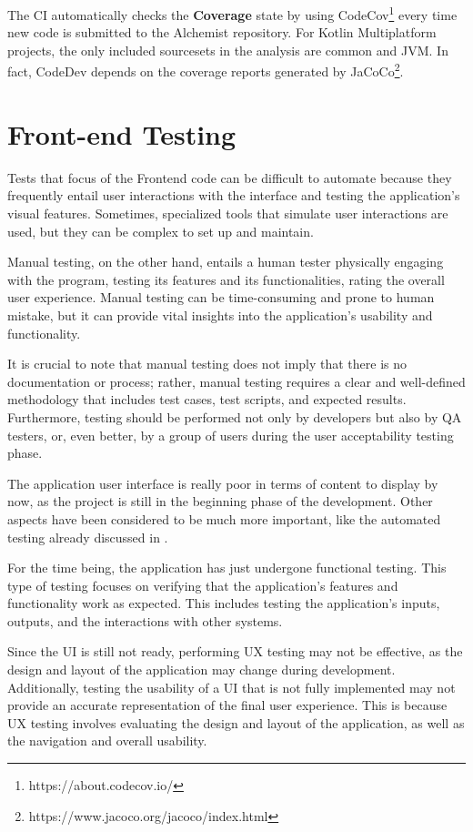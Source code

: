 The CI automatically checks the \textbf{Coverage} state by using CodeCov\footnote{https://about.codecov.io/} every time new code is submitted to the Alchemist repository. For Kotlin Multiplatform projects, the only included sourcesets in the analysis are common and JVM. In fact, CodeDev depends on the coverage reports generated by JaCoCo\footnote{https://www.jacoco.org/jacoco/index.html}.

\section{Front-end Testing}
\label{sec:front-end-testing}
Tests that focus of the Frontend code can be difficult to automate because they frequently entail user interactions with the interface and testing the application's visual features. Sometimes, specialized tools that simulate user interactions are used, but they can be complex to set up and maintain.\newline

Manual testing, on the other hand, entails a human tester physically engaging with the program, testing its features and its functionalities, rating the overall user experience. Manual testing can be time-consuming and prone to human mistake, but it can provide vital insights into the application's usability and functionality.\newline

It is crucial to note that manual testing does not imply that there is no documentation or process; rather, manual testing requires a clear and well-defined methodology that includes test cases, test scripts, and expected results. Furthermore, testing should be performed not only by developers but also by QA testers, or, even better, by a group of users during the user acceptability testing phase.\newline

The application user interface is really poor in terms of content to display by now, as the project is still in the beginning phase of the development. Other aspects have been considered to be much more important, like the automated testing already discussed in .\newline

For the time being, the application has just undergone functional testing. This type of testing focuses on verifying that the application's features and functionality work as expected. This includes testing the application's inputs, outputs, and the interactions with other systems.\newline

Since the UI is still not ready, performing UX testing may not be effective, as the design and layout of the application may change during development. Additionally, testing the usability of a UI that is not fully implemented may not provide an accurate representation of the final user experience. This is because UX testing involves evaluating the design and layout of the application, as well as the navigation and overall usability.
